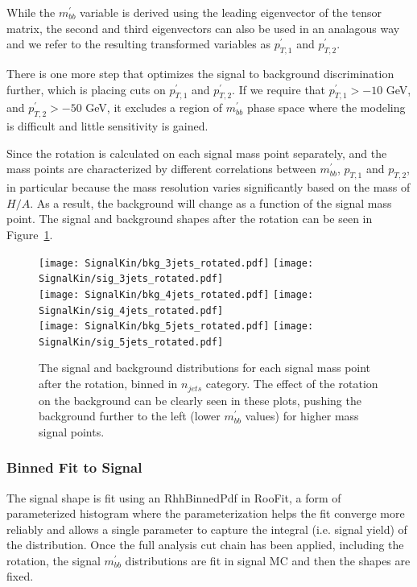 While the $m_{bb}^{'}$ variable is derived using the leading eigenvector of the
tensor matrix, the second and third eigenvectors can also be used in an analagous
way and we refer to the resulting transformed variables as $p_{T,1}^{'}$ and $p_{T,2}^{'}$.


There is one more step that optimizes the signal to background
discrimination further, which is placing cuts on $p_{T,1}^{'}$ and $p_{T,2}^{'}$.
If we require that $p_{T,1}^{'}>-10$ GeV, and $p_{T,2}^{'}>-50$ GeV, it 
excludes a region of $m_{bb}^{'}$ phase space where the modeling is difficult
and little sensitivity is gained.  

Since the rotation is calculated on each signal mass point separately, and the
mass points are characterized by different correlations between $m_{bb}^{'}$, 
$p_{T,1}$ and $p_{T,2}$, in particular because the mass resolution varies
significantly based on the mass of $H/A$.  As a result, the background will change
as a function of the signal mass point.  The signal and background shapes 
after the rotation can be seen in Figure~\ref{fig:sig_bkg_after_rotation}.


\begin{figure}[hbt]
\texttt{[image: SignalKin/bkg\_3jets\_rotated.pdf]}
\texttt{[image: SignalKin/sig\_3jets\_rotated.pdf]} \\
\texttt{[image: SignalKin/bkg\_4jets\_rotated.pdf]}
\texttt{[image: SignalKin/sig\_4jets\_rotated.pdf]} \\
\texttt{[image: SignalKin/bkg\_5jets\_rotated.pdf]}
\texttt{[image: SignalKin/sig\_5jets\_rotated.pdf]} \\
\caption{ The signal and background distributions for each signal mass 
point after the rotation, binned in $n_{jets}$ category.  The effect of the 
rotation on the background can be clearly seen in these plots, pushing the
background further to the left (lower $m^{'}_{bb}$ values) for higher mass
signal points. 
     \label{fig:sig_bkg_after_rotation}}
\end{figure}





\subsubsection{Binned Fit to Signal}

The signal shape is fit using an RhhBinnedPdf in RooFit, a form of parameterized
histogram where the parameterization helps the fit converge more reliably and allows
a single parameter to capture the integral (i.e. signal yield) of the distribution.
Once the full analysis cut chain has been applied, including the rotation, the 
signal $m_{bb}^{'}$ distributions are fit in signal MC and then the shapes are fixed.


